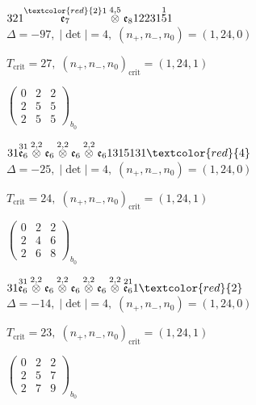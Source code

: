\documentclass[10pt]{article}
\begin{document}
$321\overset{\textcolor{red}{2}1}{\mathfrak{e}_7}\overset{4,5}{\otimes}\mathfrak{e}_812231\overset{1}{5}1$ \quad $\Delta=-97,\; |\det|=4,\; (n_+,n_-,n_0)=(1,24,0)$

\hspace{1em}$T_{\text{crit}}=27,\; (n_+,n_-,n_0)_{\text{crit}}=(1,24,1)$

\hspace{2em}$\left(\begin{smallmatrix}0 & 2 & 2 \\ 2 & 5 & 5 \\ 2 & 5 & 5\end{smallmatrix}\right)_{\!b_0}$

\smallskip

$31\overset{31}{\mathfrak{e}_6}\overset{2,2}{\otimes}\mathfrak{e}_6\overset{2,2}{\otimes}\mathfrak{e}_6\overset{2,2}{\otimes}\mathfrak{e}_61315131\textcolor{red}{4}$ \quad $\Delta=-25,\; |\det|=4,\; (n_+,n_-,n_0)=(1,24,0)$

\hspace{1em}$T_{\text{crit}}=24,\; (n_+,n_-,n_0)_{\text{crit}}=(1,24,1)$

\hspace{2em}$\left(\begin{smallmatrix}0 & 2 & 2 \\ 2 & 4 & 6 \\ 2 & 6 & 8\end{smallmatrix}\right)_{\!b_0}$

\smallskip

$31\overset{31}{\mathfrak{e}_6}\overset{2,2}{\otimes}\mathfrak{e}_6\overset{2,2}{\otimes}\mathfrak{e}_6\overset{2,2}{\otimes}\mathfrak{e}_6\overset{2,2}{\otimes}\overset{21}{\mathfrak{e}_6}1\textcolor{red}{2}$ \quad $\Delta=-14,\; |\det|=4,\; (n_+,n_-,n_0)=(1,24,0)$

\hspace{1em}$T_{\text{crit}}=23,\; (n_+,n_-,n_0)_{\text{crit}}=(1,24,1)$

\hspace{2em}$\left(\begin{smallmatrix}0 & 2 & 2 \\ 2 & 5 & 7 \\ 2 & 7 & 9\end{smallmatrix}\right)_{\!b_0}$
\end{document}
